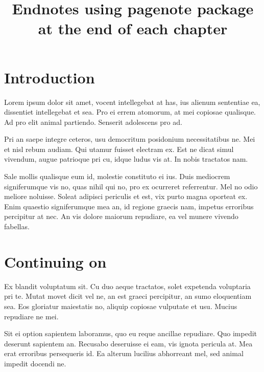 \documentclass[11pt,openany]{book}
\title{Endnotes using pagenote package at the end of each chapter}
\begin{document}
\chapter{Introduction}

Lorem ipsum dolor sit amet, vocent intellegebat at has, ius alienum sententiae ea, dissentiet intellegebat et sea. Pro ei errem atomorum, at mei copiosae qualisque. Ad pro elit animal partiendo. Senserit adolescens pro ad.

Pri an saepe integre ceteros, usu democritum posidonium necessitatibus ne. Mei et nisl rebum audiam. Qui utamur fuisset electram ex. Est ne dicat simul vivendum, augue patrioque pri cu, idque ludus vis at. In nobis tractatos nam.

Sale mollis qualisque eum id, molestie constituto ei ius. Duis mediocrem signiferumque vis no, quas nihil qui no, pro ex ocurreret referrentur. Mel no odio meliore noluisse. Soleat adipisci periculis et est, vix purto magna oporteat ex. Enim quaestio signiferumque mea an, id regione graecis nam, impetus erroribus percipitur at nec. An vis dolore maiorum repudiare, ea vel munere vivendo fabellas.

\printnotes*


\chapter{Continuing on}

Ex blandit voluptatum sit. Cu duo aeque tractatos, solet expetenda voluptaria pri te. Mutat movet dicit vel ne, an est graeci percipitur, an sumo eloquentiam sea. Eos gloriatur maiestatis no, aliquip copiosae vulputate et usu. Mucius repudiare ne mei.

Sit ei option sapientem laboramus, quo eu reque ancillae repudiare. Quo impedit deserunt sapientem an. Recusabo deseruisse ei eam, vis ignota pericula at. Mea erat erroribus persequeris id. Ea alterum lucilius abhorreant mel, sed animal impedit docendi ne.

\printnotes*
\end{document}
